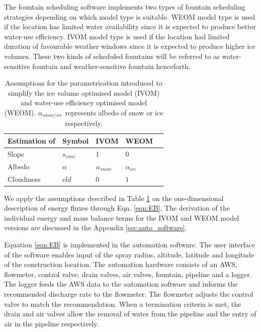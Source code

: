 The fountain scheduling software implements two types of fountain scheduling strategies depending on which
model type is suitable. WEOM model type is used if the location has limited water availability since it is expected to
produce better water-use efficiency. \ac{IVOM} model type is used if the location had limited duration of favourable
weather windows since it is expected to produce higher ice volumes. These two kinds of scheduled fountains will
be referred to as water-sensitive fountain and weather-sensitive fountain henceforth.

\begin{table}[htb]
	\centering
	\caption{Assumptions for the parametrisation introduced to simplify the ice volume optimised model (IVOM) and
		water-use efficiency optimised model (WEOM). $\alpha_{snow/ice}$ represents albedo of snow or ice respectively.}
	\label{tab:assumptions}
	\begin{tabular}{|lllll|}
		\toprule
		\textbf{Estimation of}          & \textbf{Symbol} & \textbf{IVOM}   & \textbf{WEOM}  &                       \\\midrule
		\multicolumn{1}{|l}{Slope}      & $s_{cone}$      & 1               & 0              & \multicolumn{1}{l|}{} \\
		\multicolumn{1}{|l}{Albedo}     & $\alpha$        & $\alpha_{snow}$ & $\alpha_{ice}$ & \multicolumn{1}{l|}{} \\
		\multicolumn{1}{|l}{Cloudiness} & $cld$           & $0$             & $1$            & \multicolumn{1}{l|}{} \\\bottomrule
	\end{tabular}
\end{table}

We apply the assumptions described in Table \ref{tab:assumptions} on the one-dimensional description of energy
fluxes through Eqn. \ref{eqn:EB}. The derivation of the individual energy and mass balance terms for the
\ac{IVOM} and \ac{WEOM} model versions are discussed in the Appendix \ref{sec:auto_software}.

Equation \ref{eqn:EB} is implemented in the automation software. The user interface of the software enables
input of the spray radius, altitude, latitude and longitude of the construction location. The automation
hardware consists of an AWS, flowmeter, control valve, drain valves, air valves, fountain, pipeline and a
logger. The logger feeds the AWS data to the automation software and informs the recommended discharge rate to
the flowmeter. The flowmeter adjusts the control valve to match the recommendation. When a termination
criteria is met, the drain and air valves allow the removal of water from the pipeline and the entry of
air in the pipeline respectively.

